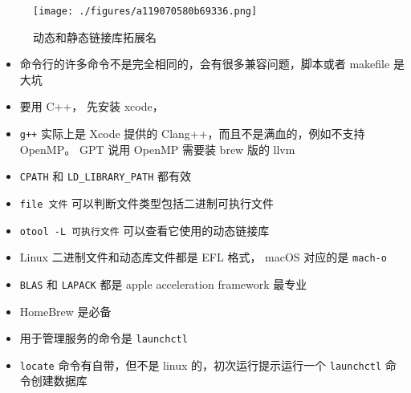 
\begin{issues}
\issueDraft
\end{issues}

\begin{figure}[ht]
\centering
\texttt{[image: ./figures/a119070580b69336.png]}
\caption{动态和静态链接库拓展名} \label{fig_MacDev_1}
\end{figure}

\begin{itemize}
\item 命令行的许多命令不是完全相同的，会有很多兼容问题，脚本或者 makefile 是大坑
\item 要用 C++， 先安装 xcode， \item \verb`g++` 实际上是 Xcode 提供的 Clang++，而且不是满血的，例如不支持 OpenMP。 GPT 说用 OpenMP 需要装 brew 版的 llvm
\item \verb`CPATH` 和 \verb`LD_LIBRARY_PATH` 都有效
\item \verb`file 文件` 可以判断文件类型包括二进制可执行文件
\item \verb`otool -L 可执行文件` 可以查看它使用的动态链接库
\item Linux 二进制文件和动态库文件都是 EFL 格式， macOS 对应的是 \verb`mach-o`
\item \verb`BLAS` 和 \verb`LAPACK` 都是 apple acceleration framework 最专业
\item HomeBrew 是必备
\item 用于管理服务的命令是 \verb`launchctl`
\item \verb`locate` 命令有自带，但不是 linux 的，初次运行提示运行一个 \verb`launchctl` 命令创建数据库
\end{itemize}
